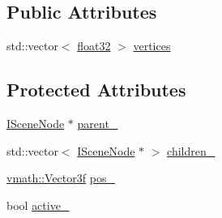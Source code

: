 \subsection*{Public Attributes}
\begin{DoxyCompactItemize}
\item 
std::vector$<$ \hyperlink{namespacecompatibility_a32a2d006ac2172c0f859370287f0104c}{float32} $>$ \hyperlink{classicee_1_1engine_1_1ISceneNode_ae3d0e1a251ee6ee09557f6cf7998c738}{vertices}
\end{DoxyCompactItemize}
\subsection*{Protected Attributes}
\begin{DoxyCompactItemize}
\item 
\hyperlink{classicee_1_1engine_1_1ISceneNode}{ISceneNode} $\ast$ \hyperlink{classicee_1_1engine_1_1ISceneNode_af44b6ffb978e0fa6bc2f56bfdcdb1baa}{parent\_\-}
\item 
std::vector$<$ \hyperlink{classicee_1_1engine_1_1ISceneNode}{ISceneNode} $\ast$ $>$ \hyperlink{classicee_1_1engine_1_1ISceneNode_a1e95d624bebefac960815a8b32f13be4}{children\_\-}
\item 
\hyperlink{classvmath_1_1Vector3f}{vmath::Vector3f} \hyperlink{classicee_1_1engine_1_1ISceneNode_a6aa82e2a759e759edb3273d129fdb222}{pos\_\-}
\item 
bool \hyperlink{classicee_1_1engine_1_1ISceneNode_a619f3bd863e568a21fd487a2e98fd0fe}{active\_\-}
\end{DoxyCompactItemize}


